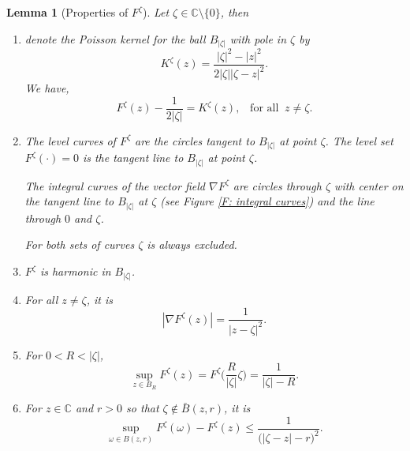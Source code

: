 \documentclass[11pt]{article}
\numberwithin{equation}{section}
\def\mydot{\boldsymbol{\cdot}}
\newtheorem{lemma}[theorem]{Lemma}
\begin{document}
\begin{lemma}[Properties of $F^{\zeta}$]
  \label{Propeties of F}
    Let $\zeta \in \mathbb{C} \setminus \{0\}$, then 
    \begin{enumerate}[label=({\alph*})]   
      \item 
        \label{p: F is shift of K}
        denote the Poisson kernel for the ball $B_{|\zeta|}$ with pole in $\zeta$ by 
        \begin{equation}\label{D: poisson kernel K}
          \nonumber
          K^{\zeta}(z) = 
          \frac{|\zeta|^2 - |z|^2}{2 |\zeta| |\zeta - z|^2}.
        \end{equation}
        We have, 
        \begin{equation} \nonumber
          F^{\zeta} (z) - \frac{1}{2|\zeta|} =  K^{\zeta}(z), 
          \;\;\;\text{for all}\;\; z \neq \zeta.
        \end{equation}  

      \item 
        \label{p: level/integral curves of F} 
        The level curves of $F^{\zeta}$ are 
        the circles tangent to $B_{|\zeta|}$ at point $\zeta$. 
        The level set $F^{\zeta}(\mydot) = 0$ is the tangent line to  
        $B_{|\zeta|}$ at point $\zeta$.
        
        The integral curves of the vector field
        $\nabla F^{\zeta}$ are circles through 
        $\zeta$ with center on the tangent line 
        to $B_{|\zeta|}$ at $\zeta$ (see Figure \ref{F: integral curves}) 
        and the line through $0$ and $\zeta$.

        For both sets of curves $\zeta$ is always excluded. 

      \item
        \label{p: F: harmonic}
        $F^{\zeta}$ is harmonic in $B_{|\zeta|}$.

      \item 
        \label{p: nambla F}
        For all $z \neq \zeta$, it is  
          \begin{equation}\nonumber
            |\nabla F^{\zeta}(z) | = \frac{1}{|z- \zeta|^2}.
          \end{equation}

      \item
        \label{p: sup F^zeta over B_r}
        For $0 < R < |\zeta|$, 
        \begin{equation}\nonumber
          \sup_{z \in B_R} F^{\zeta}(z)
          = F^{\zeta} \bigg( \frac{R}{|\zeta|}\zeta \bigg) 
          = \frac{1}{|\zeta|-R}.
        \end{equation}

      \item
        \label{p: sup of F^zeta on small circles}
        For $z \in \mathbb{C}$ and $r>0$ so that 
        $\zeta \notin \bar{B}(z,r)$, it is    
        \begin{equation}\nonumber
          \sup_{\omega \in B(z,r)} 
            F^{\zeta}(\omega) - F^{\zeta}(z) 
            \leq \frac{1}{\big( |\zeta - z| - r \big)^2}.  
        \end{equation}
    \end{enumerate}
  \end{lemma}
\end{document}
